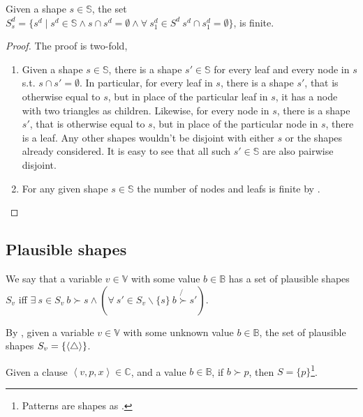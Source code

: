 \begin{theorem}\label{lemma:extend-finite-converse} Given a shape
$s\in\mathbb{S}$, the set $S_s^d=\{s^d \mid s^d\in\mathbb{S} \wedge s\cap
s^d=\emptyset \wedge \forall\ s^d_1\in S^d\ s^d\cap s^d_1=\emptyset\}$, is
finite.\end{theorem}

\begin{proof} The proof is two-fold,

\begin{enumerate}

\item Given a shape $s\in\mathbb{S}$, there is a shape $s'\in\mathbb{S}$ for
every leaf and every node in $s$ s.t. $s\cap s'=\emptyset$. In particular, for
every leaf in $s$, there is a shape $s'$, that is otherwise equal to $s$, but
in place of the particular leaf in $s$, it has a node with two triangles as
children.  Likewise, for every node in $s$, there is a shape $s'$, that is
otherwise equal to $s$, but in place of the particular node in $s$, there is a
leaf. Any other shapes wouldn't be disjoint with either $s$ or the shapes
already considered. It is easy to see that all such $s'\in\mathbb{S}$ are also
pairwise disjoint.

\item For any given shape $s\in\mathbb{S}$ the number of nodes and leafs is
finite by .\end{enumerate}\end{proof} 

\subsection{Plausible shapes}

\begin{definition} We say that a variable $v\in\mathbb{V}$ with some value
$b\in\mathbb{B}$ has a set of plausible shapes $S_v$ iff $\exists\ s\in S_v\
b\succ s \wedge \left( \forall\ s'\in S_v\backslash\{s\}\ b \not{\succ} s'
\right)$.\end{definition}

\begin{corollary} By , given a variable
$v\in\mathbb{V}$ with some unknown value $b\in\mathbb{B}$, the set of plausible
shapes $S_v=\{\left\langle\bigtriangleup\right\rangle\}$.\end{corollary}

\begin{corollary} Given a clause $\left\langle v,p,x
\right\rangle\in\mathbb{C}$, and a value $b\in\mathbb{B}$, if $b\succ p$, then
$S=\{p\}$\footnote{Patterns are shapes as
.}.\end{corollary}

